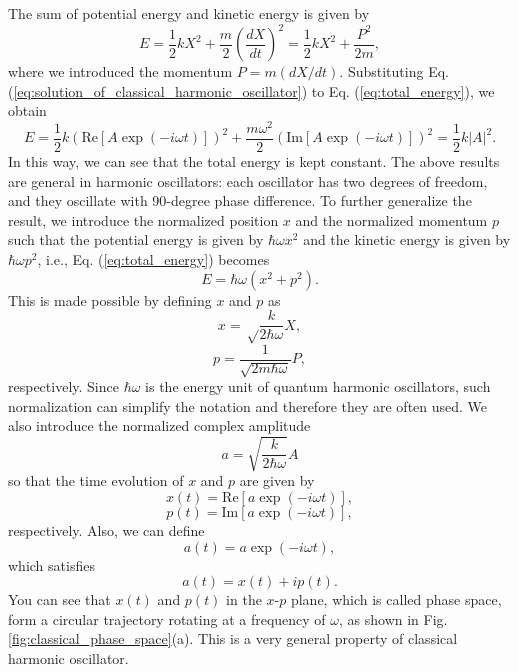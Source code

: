The sum of potential energy and kinetic energy is given by
\begin{equation}
  E = \frac{1}{2}kX^2 + \frac{m}{2}\left(\frac{dX}{dt} \right)^2 = \frac{1}{2}kX^2 + \frac{P^2}{2m},
  \label{eq:total_energy}
\end{equation}
where we introduced the momentum $P = m(dX/dt)$. Substituting Eq. (\ref{eq:solution_of_classical_harmonic_oscillator}) to Eq. (\ref{eq:total_energy}), we obtain
\begin{equation}
  E= \frac{1}{2}k(\mathrm{Re} [A\exp(-i\omega t)])^2 + \frac{m\omega^2}{2} (\mathrm{Im} [A\exp(-i\omega t)])^2 = \frac{1}{2}k|A|^2.
\end{equation}
In this way, we can see that the total energy is kept constant.
The above results are general in harmonic oscillators: each oscillator has two degrees of freedom, and they oscillate with 90-degree phase difference. To further generalize the result, we introduce the normalized position $x$ and the normalized momentum $p$ such that the potential energy is given by $\hbar \omega x^2$ and the kinetic energy is given by $\hbar \omega p^2$, i.e., Eq. (\ref{eq:total_energy}) becomes
\begin{equation}
  E = \hbar \omega (x^2 + p^2).
\end{equation}
This is made possible by defining $x$ and $p$ as
\begin{equation}
  x = \sqrt \frac{k}{2\hbar\omega} X,
  \label{eq:normalized_position}
\end{equation}
\begin{equation}
  p = \frac{1}{\sqrt{2m\hbar \omega}}P,
  \label{eq:normalized_momentum}
\end{equation}
respectively. Since $\hbar \omega$ is the energy unit of quantum harmonic oscillators, such normalization can simplify the notation and therefore they are often used. We also introduce the normalized complex amplitude
\begin{equation}
  a = \sqrt{\frac{k}{2\hbar \omega}}A
\end{equation}
so that the time evolution of $x$ and $p$ are given by
\begin{equation}
  x(t) = \mathrm{Re}[a \exp(-i\omega t)],
\end{equation}
\begin{equation}
  p(t) = \mathrm{Im}[a \exp(-i\omega t)],
\end{equation}
respectively. Also, we can define 
\begin{equation}
  a(t) = a\exp(-i\omega t), 
  \label{eq:normalized_complex_amplitude}
\end{equation}
which satisfies
\begin{equation}
  a(t) = x(t) + ip(t).
\end{equation}
You can see that $x(t)$ and $p(t)$ in the $x$-$p$ plane, which is called phase space, form a circular trajectory rotating at a frequency of $\omega$, as shown in Fig. {\ref{fig:classical_phase_space}}(a). This is a very general property of classical harmonic oscillator. 

